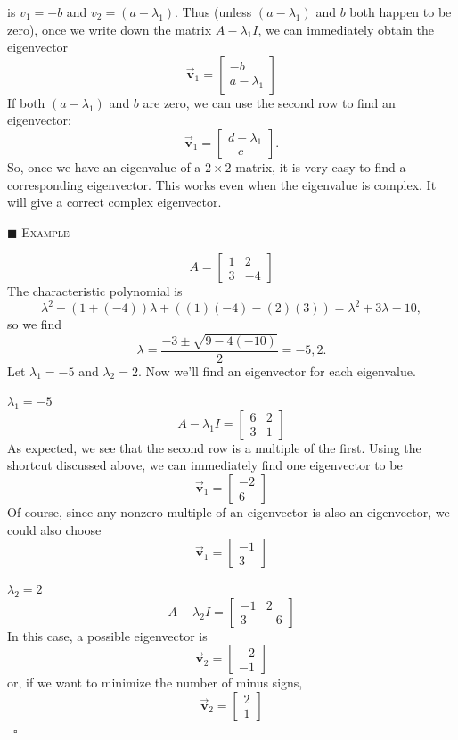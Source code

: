 \documentclass[reqno]{immbook}
\newcommand{\BV}{\vec{\textbf{v}}}
\numberwithin{equation}{chapter}
\numberwithin{question}{section}
\numberwithin{theorem}{chapter}
\numberwithin{figure}{chapter}
\theoremstyle{definition}
\newenvironment{xexample}%
{%

\medskip\noindent\addtocounter{example}{1}$\blacksquare$ \textsc{Example \theexample}\hspace*{1em}%
}%
{%
~\hfill$\square$

\medskip
}
\begin{document}
is $v_1=-b$ and $v_2 = (a-\lambda_1)$.
Thus (unless $(a-\lambda_1)$ and $b$ both happen to be
zero), once we write down the matrix $A-\lambda_1 I$,
we can immediately obtain the eigenvector
\[
   \BV_1 = \begin{bmatrix} -b \\ a-\lambda_1 \end{bmatrix}
\]
If both $(a-\lambda_1)$ and $b$ are zero, we can use the
second row to find an eigenvector:
\[
   \BV_1 = \begin{bmatrix} d-\lambda_1 \\ -c \end{bmatrix}.
\]
So, once we have an eigenvalue
of a $2\times 2$ matrix, it is very easy to find
a corresponding eigenvector.
This works even when the eigenvalue is complex.
It will give a correct complex eigenvector.

\begin{xexample}
\[
   A = \begin{bmatrix} 1 & 2 \\ 3 & -4 \end{bmatrix}
\]
The characteristic polynomial is
\[
   \lambda^2 - (1+(-4))\lambda + ((1)(-4)-(2)(3)) = \lambda^2 + 3\lambda - 10,
\]
so we find
\[
  \lambda = \frac{-3\pm\sqrt{9-4(-10)}}{2} = -5, 2.
\]
Let $\lambda_1 = -5$ and $\lambda_2 = 2$.
Now we'll find an eigenvector for each eigenvalue.

\medskip
\noindent
\underline{$\lambda_1 = -5$}
\[
   A-\lambda_1 I = \begin{bmatrix}
                   6 & 2 \\ 3 & 1
                   \end{bmatrix}
\]
As expected, we see that the second row
is a multiple of the first. Using the shortcut discussed
above, we can immediately find one eigenvector to be
\[
   \BV_1 = \begin{bmatrix} -2 \\ 6 \end{bmatrix}
\]
Of course, since any nonzero multiple of an eigenvector
is also an eigenvector, we could also choose
\[
   \BV_1 = \begin{bmatrix} -1 \\ 3 \end{bmatrix}
\]

\medskip
\noindent
\underline{$\lambda_2 = 2$}
\[
  A - \lambda_2 I = \begin{bmatrix}
                      -1 & 2 \\ 3 & -6
                    \end{bmatrix}
\]
In this case, a possible eigenvector is
\[
  \BV_2 = \begin{bmatrix} -2 \\ -1 \end{bmatrix}
\]
or, if we want to minimize the number of minus signs,
\[
  \BV_2 = \begin{bmatrix} 2 \\ 1 \end{bmatrix}
\]
\end{xexample}
\end{document}

